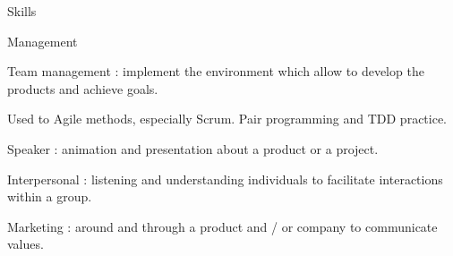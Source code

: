 \begin{rSection}{Skills}
  \begin{rSubsection}{Management}{}{}{}
    \item Team management : implement the environment which allow to develop the products and achieve goals.
    \item Used to Agile methods, especially Scrum. Pair programming and TDD practice.
    \item Speaker : animation and presentation about a product or a project.
    \item Interpersonal : listening and understanding individuals to facilitate interactions within a group.
    \item Marketing : around and through a product and / or company to communicate values.
  \end{rSubsection}

\end{rSection}
